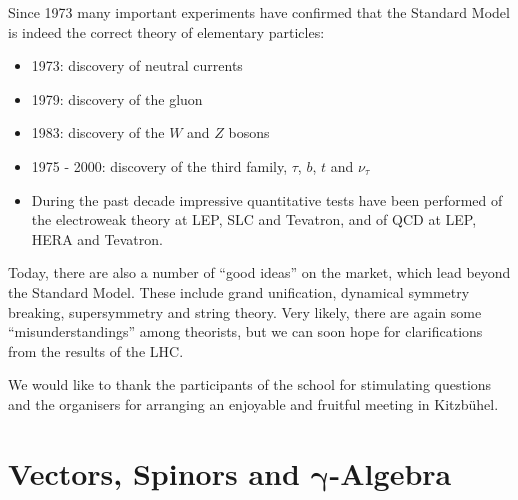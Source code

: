 \documentclass[12pt]{report}
\newcommand{\2}{\ensuremath{\sqrt{2}\,}}
\begin{document}
{           Since 1973 many important experiments have confirmed that the Standard Model is indeed
           the correct theory of elementary particles:
       \begin{itemize}
           \item 1973: discovery of neutral currents
            
           \item 1979: discovery of the gluon

           \item 1983: discovery of the $W$ and $Z$ bosons

           \item 1975 - 2000: discovery of the third family, $\tau$, $b$, $t$ and $\nu_\tau$

           \item During the past decade impressive quantitative tests have been performed of
           the electroweak theory at LEP, SLC and Tevatron, and of QCD at LEP, HERA and Tevatron.
        \end{itemize}

       Today, there are also a number of ``good ideas'' on the market, which lead beyond the Standard Model.
       These include grand unification, dynamical symmetry breaking, supersymmetry and string theory.
       Very likely, there are again some ``misunderstandings'' among theorists, but we can soon hope for
       clarifications from the results of the LHC.  
            

       \bigskip
       \noindent
       \hspace{1cm}\hrulefill\hspace{1cm}

       \vfill
       \noindent
       We would like to thank the participants of the school for stimulating questions and the
       organisers for arranging an enjoyable and fruitful meeting in Kitzb\"{u}hel.
       



  \appendix
  \chapter{Vectors, Spinors and $\boldsymbol \gamma$-Algebra}
    \label{sec:algebra-appendix}
    
}
\end{document}
